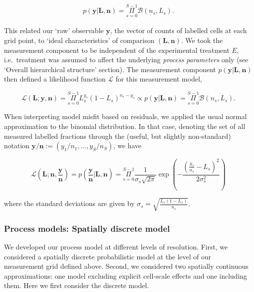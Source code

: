 \documentclass[10pt,letterpaper]{article}
\begin{document}
\begin{align}p(\mathbf{y}|\mathbf{L},\mathbf{n}) = \underset{s=0}{\overset{S-1}{\Pi}}\mathcal{B}(n_s,L_s).\end{align}

This related our `raw' observable \(\mathbf{y}\), the vector of counts
of labelled cells at each grid point, to `ideal characteristics' of
comparison \((\mathbf{L},\mathbf{n})\). We took the measurement
component to be independent of the experimental treatment \(E\),
i.e.~treatment was assumed to affect the underlying \emph{process
parameters} only (see `Overall hierarchical structure' section). The
measurement component \(p(\mathbf{y}|\mathbf{L},\mathbf{n})\) then
defined a likelihood function \(\mathcal{L}\) for this measurement
model,

\begin{equation}\mathcal{L}(\mathbf{L};\mathbf{y},\mathbf{n}) = \underset{s=0}{\overset{S-1}{\Pi}}
L_s^{y_s}(1-L_s)^{n_s-y_s} \propto p(\mathbf{y}|\mathbf{L},\mathbf{n}) = \underset{s=0}{\overset{S-1}{\Pi}}\mathcal{B}(n_s,L_s).\label{eq:likel-binom}\end{equation}

When interpreting model misfit based on residuals, we applied the usual
normal approximation to the binomial distribution. In that case,
denoting the set of all measured labelled fractions through the (useful,
but slightly non-standard) notation
\(\mathbf{y}/\mathbf{n} := (y_1/n_1,...,y_S/n_S)\), we have

\begin{equation}\mathcal{L}(\mathbf{L};\mathbf{n},\frac{\mathbf{y}}{\mathbf{n}}) = p(\frac{\mathbf{y}}{\mathbf{n}}|\mathbf{L},\mathbf{n}) =
\underset{s=0}{\overset{S-1}{\Pi}} \frac{1}{\sigma_s
\sqrt{2\pi}}\exp{(-\frac{(\frac{y_s}{n_s}-L_s)^2}{2\sigma_s^2})}\label{eq:likel-norma}\end{equation}

where the standard deviations are given by
\(\sigma_s = \sqrt{\frac{L_s(1-L_s)}{n_s}}\).

\subsubsection{Process models: Spatially discrete model}\label{process-models-discrete}

We developed our process model at different levels of resolution. First,
we considered a spatially discrete probabilistic model at the level of
our measurement grid defined above. Second, we considered two spatially
continuous approximations: one model excluding explicit cell-scale
effects and one including them. Here we first consider the discrete model.
\end{document}
